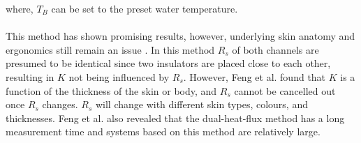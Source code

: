 where, $T_{B}$ can be set to the preset water temperature. 
\\
\\
This method has shown promising results, however, underlying skin anatomy and ergonomics still remain an issue \cite{Atallah2018}. In this method $R_{s}$ of both channels are presumed to be identical since two insulators are placed close to each other, resulting in $K$ not being influenced by $R_{s}$. However, Feng et al. \cite{Feng2017} found that $K$ is a function of the thickness of the skin or body, and $R_{s}$ cannot be cancelled out once $R_{s}$ changes. $R_{s}$ will change with different skin types, colours, and thicknesses. Feng et al. \cite{Feng2017} also revealed that the dual-heat-flux method has a long measurement time and systems based on this method are relatively large.

